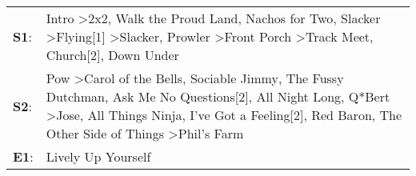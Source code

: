 \begin{supertabular}{p{0.03\textwidth}p{0.92\textwidth}}
 \textbf{S1}:  &                                                                            Intro\textsuperscript{} \textgreater \enspace 2x2\textsuperscript{}, \enspace Walk the Proud Land\textsuperscript{}, \enspace Nachos for Two\textsuperscript{}, \enspace Slacker\textsuperscript{} \textgreater \enspace Flying[1]\textsuperscript{} \textgreater \enspace Slacker\textsuperscript{}, \enspace Prowler\textsuperscript{} \textgreater \enspace Front Porch\textsuperscript{} \textgreater \enspace Track Meet\textsuperscript{}, \enspace Church[2]\textsuperscript{}, \enspace Down Under\textsuperscript{}  \enspace  \\
 \textbf{S2}:  &  Pow\textsuperscript{} \textgreater \enspace Carol of the Bells\textsuperscript{}, \enspace Sociable Jimmy\textsuperscript{}, \enspace The Fussy Dutchman\textsuperscript{}, \enspace Ask Me No Questions[2]\textsuperscript{}, \enspace All Night Long\textsuperscript{}, \enspace Q*Bert\textsuperscript{} \textgreater \enspace Jose\textsuperscript{}, \enspace All Things Ninja\textsuperscript{}, \enspace I've Got a Feeling[2]\textsuperscript{}, \enspace Red Baron\textsuperscript{}, \enspace The Other Side of Things\textsuperscript{} \textgreater \enspace Phil's Farm\textsuperscript{}  \enspace  \\
 \textbf{E1}:  &                                                                                                                                                                                                                                                                                                                                                                                                                                                                                                                                                                    Lively Up Yourself\textsuperscript{}  \enspace  \\
\end{supertabular}
